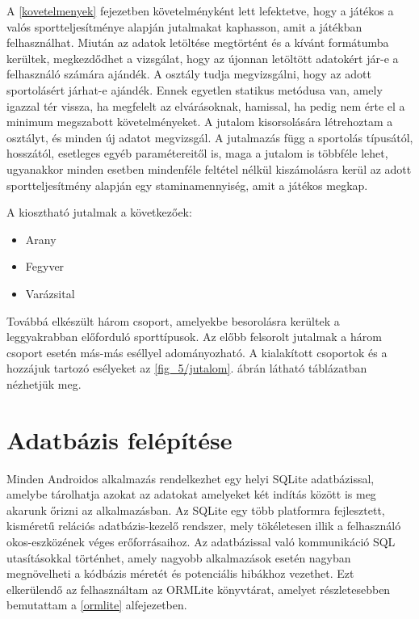 A \ref{kovetelmenyek} fejezetben követelményként lett lefektetve, hogy a játékos a valós sportteljesítménye alapján jutalmakat kaphasson, amit a játékban felhasználhat. 
Miután az adatok letöltése megtörtént és a kívánt formátumba kerültek, megkezdődhet a vizsgálat, hogy az újonnan letöltött adatokért jár-e a felhasználó számára ajándék. 
A  osztály tudja megvizsgálni, hogy az adott sportolásért járhat-e ajándék. 
Ennek egyetlen statikus metódusa van, amely igazzal tér vissza, ha megfelelt az elvárásoknak, hamissal, ha pedig nem érte el a minimum megszabott követelményeket. 
A jutalom kisorsolására létrehoztam a  osztályt, és minden új adatot megvizsgál. 
A jutalmazás függ a sportolás típusától, hosszától, esetleges egyéb paramétereitől is, maga a jutalom is többféle lehet, ugyanakkor minden esetben mindenféle feltétel nélkül kiszámolásra kerül az adott sportteljesítmény alapján egy staminamennyiség, amit a játékos megkap. 

A kiosztható jutalmak a következőek:

\begin{itemize}
	\item Arany
	\item Fegyver 
	\item Varázsital 
\end{itemize}

Továbbá elkészült három csoport, amelyekbe besorolásra kerültek a leggyakrabban előforduló sporttípusok. 
Az előbb felsorolt jutalmak a három csoport esetén más-más eséllyel adományozható. 
A kialakított csoportok és a hozzájuk tartozó esélyeket az \ref{fig_5/jutalom}. ábrán látható táblázatban nézhetjük meg. 


\section{Adatbázis felépítése}
\label{database}

Minden Androidos alkalmazás rendelkezhet egy helyi SQLite adatbázissal, amelybe tárolhatja azokat az adatokat amelyeket két indítás között is meg akarunk őrizni az alkalmazásban. 
Az SQLite egy több platformra fejlesztett, kisméretű relációs adatbázis-kezelő rendszer, mely tökéletesen illik a felhasználó okos-eszközének véges erőforrásaihoz. 
Az adatbázissal való kommunikáció SQL utasításokkal történhet, amely nagyobb alkalmazások esetén nagyban megnövelheti a kódbázis méretét és potenciális hibákhoz vezethet. 
Ezt elkerülendő az felhasználtam az ORMLite könyvtárat, amelyet részletesebben bemutattam a \ref{ormlite} alfejezetben. 


